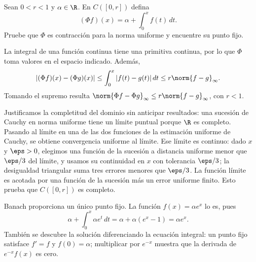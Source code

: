 \begin{ejercicio}
Sean $0<r<1$ y $\alpha\in\R$. En $C([0,r])$ defina
\[
 (\Phi f)(x)=\alpha+\int_0^x f(t)\,dt.
\]
Pruebe que $\Phi$ es contracción para la norma uniforme y encuentre su punto fijo.
\end{ejercicio}
\begin{solucion}
La integral de una función continua tiene una primitiva continua, por lo que $\Phi$ toma valores en el espacio indicado. Además,
\[
 |(\Phi f)(x)-(\Phi g)(x)|
 \leq\int_0^x|f(t)-g(t)|\,dt
 \leq r\norm{f-g}_\infty.
\]
Tomando el supremo resulta $\norm{\Phi f-\Phi g}_\infty\leq r\norm{f-g}_\infty$, con $r<1$.

Justificamos la completitud del dominio sin anticipar resultados: una sucesión de Cauchy en norma uniforme tiene un límite puntual porque $\R$ es completo. Pasando al límite en una de las dos funciones de la estimación uniforme de Cauchy, se obtiene convergencia uniforme al límite. Ese límite es continuo: dado $x$ y $\eps>0$, elegimos una función de la sucesión a distancia uniforme menor que $\eps/3$ del límite, y usamos su continuidad en $x$ con tolerancia $\eps/3$; la desigualdad triangular suma tres errores menores que $\eps/3$. La función límite es acotada por una función de la sucesión más un error uniforme finito. Esto prueba que $C([0,r])$ es completo.

Banach proporciona un único punto fijo. La función $f(x)=\alpha e^x$ lo es, pues
\[
 \alpha+\int_0^x\alpha e^t\,dt=\alpha+\alpha(e^x-1)=\alpha e^x.
\]
También se descubre la solución diferenciando la ecuación integral: un punto fijo satisface $f'=f$ y $f(0)=\alpha$; multiplicar por $e^{-x}$ muestra que la derivada de $e^{-x}f(x)$ es cero.
\end{solucion}

